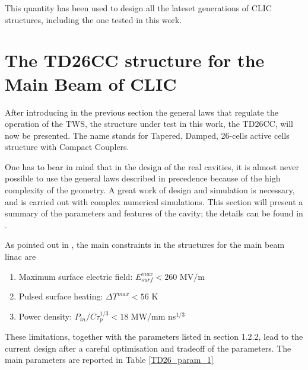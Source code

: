 This quantity has been used to design all the lateset generations of CLIC structures, including the one tested in this work.






\section[The TD26CC structure for the Main Beam of CLIC]{The TD26CC structure for the Main Beam of CLIC}

After introducing in the previous section the general laws that regulate the operation of the TWS, the structure under test in this work, the TD26CC, will now be presented. The name stands for Tapered, Damped, 26-cells active cells structure with Compact Couplers.

One has to bear in mind that in the design of the real cavities, it is almost never possible to use the general laws described in precedence because of the high complexity of the geometry. A great work of design and simulation is necessary, and is carried out with complex numerical simulations. This section will present a summary of the parameters and features of the cavity; the details can be found in \cite{CLIC:cdr,Grudiev:td26cc,Lunin:1333709}.

As pointed out in \cite{CLIC:cdr}, the main constraints in the structures for the main beam linac are 
\begin{enumerate}
\item Maximum surface electric field: $E_{surf}^{max} < 260$ MV/m
\item Pulsed surface heating: $\Delta T^{max} < 56$ K
\item Power density: $P_{in}/C\tau_p^{1/3} < 18$ MW/mm ns$^{1/3}$
\end{enumerate}

These limitations, together with the parameters listed in section 1.2.2, lead to the current design after a careful optimisation and tradeoff of the parameters. The main parameters are reported in Table \ref{TD26_param_1}


